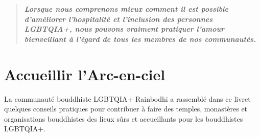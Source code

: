 \documentclass[12pt,openany]{book}
\begin{document}
\begin{figure}[h]
    \centering
\end{figure}

\begin{quote}
\centering
\doublespacing
\textit{\Large \textbf{Lorsque nous comprenons mieux comment il est possible d'améliorer l'hospitalité et l'inclusion des personnes \mbox{LGBTQIA+}, nous pouvons vraiment pratiquer l'amour bienveillant à l'égard de tous les membres de nos communautés.}}
\end{quote}
\endgroup
\color{black}

\setlength{\parindent}{15pt}
\chapter*{Accueillir l’Arc-en-ciel}

\begin{figure}
\end{figure}
\noindent La communauté bouddhiste \mbox{LGBTQIA+} Rainbodhi a rassemblé dans ce livret quelques conseils pratiques pour contribuer à faire des temples, monastères et organisations bouddhistes des lieux sûrs et accueillants pour les bouddhistes \mbox{LGBTQIA+}.
\end{document}
